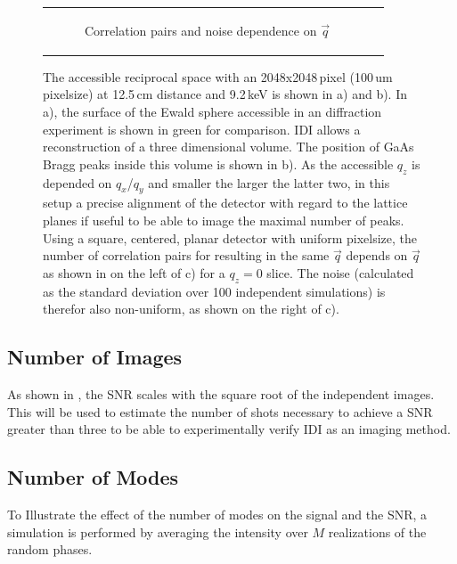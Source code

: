 \begin{figure}[!htb]
\begin{tabular}[t]{cc}
\begin{subfigure}{0.52\textwidth}
	\caption{Correlation pairs and noise dependence on $\vec{q}$ } 
\end{subfigure}\\
	\end{tabular}
	\caption[Accessible reciprocal space]{The accessible reciprocal space with an 2048x2048\,pixel (100\,um pixelsize) at 12.5\,cm distance and 9.2\,keV is shown in a) and b). In a), the surface of the Ewald sphere accessible in an diffraction experiment is shown in green for comparison. IDI allows a reconstruction of a three dimensional volume. The position of GaAs Bragg peaks inside this volume is shown in b). As the accessible $q_z$ is depended on $q_x$/$q_y$ and smaller the larger the latter two, in this setup a precise alignment of the detector with regard to the lattice planes if useful to be able to image the maximal number of peaks. Using a square, centered, planar detector with uniform pixelsize, the number of correlation pairs for resulting in the same $\vec{q}$ depends on $\vec{q}$ as shown in on the left of c) for a $q_z=0$ slice. The noise (calculated as the standard deviation over 100 independent simulations) is therefor also non-uniform, as shown on the right of c).}
	
\end{figure}



\subsection{Number of Images}
As shown in , the SNR scales with  the square root of the independent images. This will be used to estimate the number of shots necessary to achieve a SNR greater than three to be able to experimentally verify IDI as an imaging method.
 
\subsection{Number of Modes}
To Illustrate the effect of the number of modes on the signal and the SNR, a simulation is performed by averaging the intensity over $M$ realizations of the random phases.  

